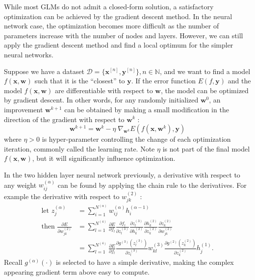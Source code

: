 \documentclass[12pt]{article}
\newcommand{\de}{\partial}
\newcommand{\mb}{\mathbf}
\begin{document}
\pagebreak 

While most GLMs do not admit a closed-form solution,
a satisfactory optimization can be achieved by the gradient descent method.
In the neural network case,
the optimization becomes more difficult as
the number of parameters increase with the number of nodes and layers.
However, we can still apply the gradient descent method
and find a local optimum for the simpler neural networks.

Suppose we have a dataset $\mathcal{D} = \{\mb{x}^{[n]}, 
\mb{y}^{[n]}\}, n \in \mathbb{N}$,
and we want to find a model $f(\mb{x},\mb{w})$ such that 
it is the ``closest'' to $\mb{y}$.
If the error function $E(f,\mb{y})$
and the model $f(\mb{x},\mb{w})$ are differentiable
with respect to $\mb{w}$,
the model can be optimized by gradient descent.
In other words, for any randomly initialized $\mb{w}^0$,
an improvement $\mb{w}^{k+1}$ can be obtained by making a 
small modification
in the direction of the gradient with respect to $\mb{w}^k$ :
%
\begin{equation}
	\mb{w}^{k+1} = \mb{w}^{k} - \eta \; \nabla_{\mb{w}^k} 
					E\left(f(\mb{x},\mb{w}^k),\mb{y}\right)
\end{equation}
%
where $\eta > 0$ is hyper-parameter controlling the change of 
each optimization iteration, commonly called the learning rate.
Note $\eta$ is not part of the final model $f(\mb{x},\mb{w})$,
but it will significantly influence optimization.

In the two hidden layer neural network previously,
a derivative with respect to any weight 
$w_{ij}^{(\alpha)}$ can be found
by applying the chain rule to the derivatives.
For example the derivative with respect to $w_{jk}^{(2)}$ :
%
\begin{equation}
\begin{aligned}
	\text{let } z_j^{(\alpha)} &= 
		\sum_{i=1}^{N^{(\alpha)}} w_{ij}^{(\alpha)} h_i^{(\alpha-1)} \\
	\text{then } \frac{\de E}{\de w_{jk}^{(2)}} &= 
		\sum_{l=1}^{N^{(4)}} \frac{\de E}{\de f_l}
		\frac{\de f_l}{\de z_l^{(3)}}
		\frac{\de z_l^{(3)}}{\de h_k^{(2)}}
		\frac{\de h_k^{(2)}}{\de z_k^{(2)}}
		\frac{\de z_k^{(2)}}{\de w_{jk}^{(2)}} \\
	&=
		\sum_{l=1}^{N^{(4)}} \frac{\de E}{\de f_l}
		\frac{\de g^{(3)}(z_l^{(3)}) } {\de z_l^{(3)}}
		w_{kl}^{(3)}
		\frac{\de g^{(2)}(z_k^{(2)}) } {\de z_k^{(2)}}
		h_j^{(1)} .
\end{aligned}
\end{equation}
%
Recall $g^{(\alpha)}(\cdot)$ is selected to have a simple derivative,
making the complex appearing gradient term above easy to compute.
\end{document}
